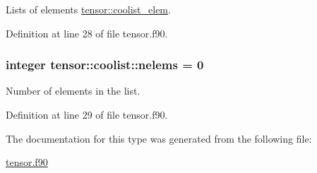 Lists of elements \hyperlink{structtensor_1_1coolist__elem}{tensor\-::coolist\-\_\-elem}. 



Definition at line 28 of file tensor.\-f90.

\hypertarget{structtensor_1_1coolist_aac72e7727f1b161da2b9d54e25eb7aae}{
\subsubsection[{nelems}]{\setlength{\rightskip}{0pt plus 5cm}integer tensor\-::coolist\-::nelems = 0}}\label{structtensor_1_1coolist_aac72e7727f1b161da2b9d54e25eb7aae}


Number of elements in the list. 



Definition at line 29 of file tensor.\-f90.



The documentation for this type was generated from the following file\-:\begin{DoxyCompactItemize}
\item 
\hyperlink{tensor_8f90}{tensor.\-f90}\end{DoxyCompactItemize}
